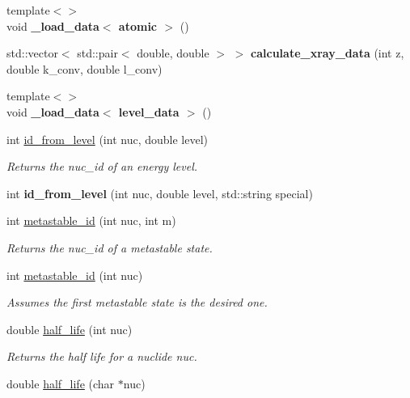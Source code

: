 \begin{DoxyCompactItemize}
\item 
{\footnotesize template$<$$>$ }\\void {\bfseries \+\_\+load\+\_\+data$<$ atomic $>$} ()\hypertarget{namespacepyne_a23231dd4e875d332e36d5cdc5cce1341}{}\label{namespacepyne_a23231dd4e875d332e36d5cdc5cce1341}

\item 
std\+::vector$<$ std\+::pair$<$ double, double $>$ $>$ {\bfseries calculate\+\_\+xray\+\_\+data} (int z, double k\+\_\+conv, double l\+\_\+conv)\hypertarget{namespacepyne_afc348e3a1127277ad3deacb309faddf1}{}\label{namespacepyne_afc348e3a1127277ad3deacb309faddf1}

\item 
{\footnotesize template$<$$>$ }\\void {\bfseries \+\_\+load\+\_\+data$<$ level\+\_\+data $>$} ()\hypertarget{namespacepyne_ad12885416300033e2563dfe87e764f7c}{}\label{namespacepyne_ad12885416300033e2563dfe87e764f7c}

\item 
int \hyperlink{namespacepyne_a11f4852ba4824c0e047b509efe0c6b8c}{id\+\_\+from\+\_\+level} (int nuc, double level)
\begin{DoxyCompactList}\small\item\em Returns the nuc\+\_\+id of an energy level. \end{DoxyCompactList}\item 
int {\bfseries id\+\_\+from\+\_\+level} (int nuc, double level, std\+::string special)\hypertarget{namespacepyne_aa3d3232f957170f144e412fa170aaa58}{}\label{namespacepyne_aa3d3232f957170f144e412fa170aaa58}

\item 
int \hyperlink{namespacepyne_a2e817a4d6dac740b6fa883ac99272201}{metastable\+\_\+id} (int nuc, int m)
\begin{DoxyCompactList}\small\item\em Returns the nuc\+\_\+id of a metastable state. \end{DoxyCompactList}\item 
int \hyperlink{namespacepyne_ae4f71f8816cbdd47588d1c3c5fb4908c}{metastable\+\_\+id} (int nuc)\hypertarget{namespacepyne_ae4f71f8816cbdd47588d1c3c5fb4908c}{}\label{namespacepyne_ae4f71f8816cbdd47588d1c3c5fb4908c}

\begin{DoxyCompactList}\small\item\em Assumes the first metastable state is the desired one. \end{DoxyCompactList}\item 
double \hyperlink{namespacepyne_a98f776164d1812878cb4b4ee4ef943f5}{half\+\_\+life} (int nuc)
\begin{DoxyCompactList}\small\item\em Returns the half life for a nuclide {\itshape nuc}. \end{DoxyCompactList}\item 
double \hyperlink{namespacepyne_a120acb7c7ff96c26ff012aa192212160}{half\+\_\+life} (char $\ast$nuc)\hypertarget{namespacepyne_a120acb7c7ff96c26ff012aa192212160}{}\label{namespacepyne_a120acb7c7ff96c26ff012aa192212160}


\end{DoxyCompactItemize}
